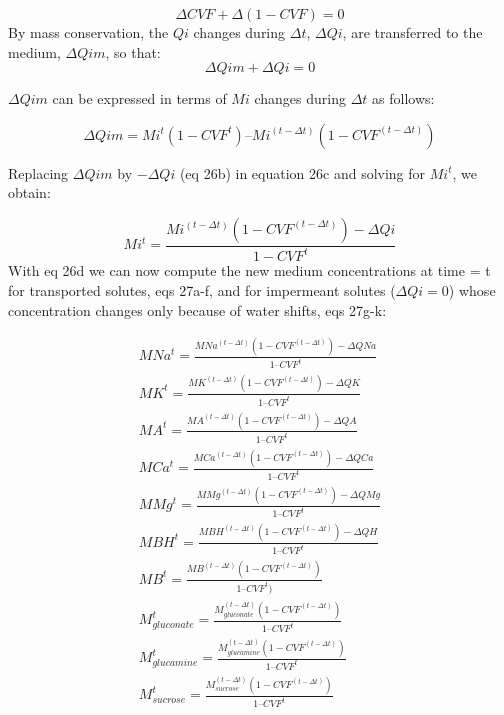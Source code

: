 \documentclass[a4paper]{article}
\newcommand{\med}[1]{M#1}
\newcommand{\MA}{\med{A}}
\newcommand{\MB}{\med{B}}
\newcommand{\MBH}{\med{BH}}
\newcommand{\MGluca}{M_{glucamine}}
\newcommand{\MNa}{\med{Na}}
\newcommand{\MK}{\med{K}}
\newcommand{\MGluco}{M_{gluconate}}
\newcommand{\MCa}{\med{Ca}}
\newcommand{\MMg}{\med{Mg}}
\newcommand{\MSuc}{M_{sucrose}}
\begin{document}
\setcounter{equation}{0}
\renewcommand{\theequation}{26\alph{equation}}

\begin{equation}
\Delta CVF + \Delta (1-CVF) = 0
\end{equation}
By mass conservation, the $Qi$ changes during $\Delta t$, $\Delta Qi$, are transferred to the medium, $\Delta Qim$, so that:
\begin{equation}
\Delta Qim + \Delta Qi = 0  
\end{equation}

$\Delta Qim$ can be expressed in terms of $Mi$ changes during $\Delta t$ as follows:

\begin{equation}
\Delta Qim = Mi^t(1-CVF^t) – Mi^{(t-\Delta t)}(1-CVF^{(t-\Delta t)}) 
\end{equation}

Replacing $\Delta Qim$ by $-\Delta Qi$ (eq 26b) in equation 26c and solving for $Mi^t$, we obtain:

\begin{equation}
Mi^t = \frac{Mi^{(t-\Delta t)}(1 - CVF^{(t-\Delta t)}) - \Delta Qi}{1 - CVF^t}
\end{equation}
With eq 26d we can now compute the new medium concentrations at time = t for transported solutes, eqs 27a-f, and for impermeant solutes ($\Delta Qi = 0$) whose concentration changes only because of water shifts, eqs 27g-k:

\setcounter{equation}{0}
\renewcommand{\theequation}{27\alph{equation}}

\begin{eqnarray}
\MNa^t = \frac{\MNa^{(t-\Delta t)}(1-CVF^{(t-\Delta t)}) - \Delta QNa}{1 – CVF^t }\\
\MK^t = \frac{\MK^{(t-\Delta t)}(1-CVF^{(t-\Delta t)}) - \Delta QK}{1 – CVF^t }\\
\MA^t = \frac{\MA^{(t-\Delta t)}(1-CVF^{(t-\Delta t)}) - \Delta QA}{1 – CVF^t }\\
\MCa^t = \frac{\MCa^{(t-\Delta t)}(1-CVF^{(t-\Delta t)}) - \Delta QCa}{1 – CVF^t }\\
\MMg^t = \frac{\MMg^{(t-\Delta t)}(1-CVF^{(t-\Delta t)}) - \Delta QMg}{1 – CVF^t }\\
\MBH^t = \frac{\MBH^{(t-\Delta t)}(1-CVF^{(t-\Delta t)}) - \Delta QH}{1 – CVF^t }\\
\MB^t = \frac{\MB^{(t-\Delta t)}(1-CVF^{(t-\Delta t)})}{1 – CVF^t) }\\
\MGluco^t = \frac{\MGluco^{(t-\Delta t)}(1-CVF^{(t-\Delta t)})}{1 – CVF^t }\\
\MGluca^t = \frac{\MGluca^{(t-\Delta t)}(1-CVF^{(t-\Delta t)})}{1 – CVF^t }\\
\MSuc^t = \frac{\MSuc^{(t-\Delta t)}(1-CVF^{(t-\Delta t)})}{1 – CVF^t} 
\end{eqnarray}
\end{document}
